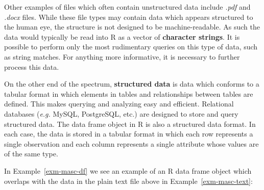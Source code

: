 \documentclass[
  letterpaper,
  DIV=11,
  numbers=noendperiod]{scrreport}
\theoremstyle{definition}
\theoremstyle{remark}
\begin{document}
Other examples of files which often contain unstructured data include
\emph{.pdf} and \emph{.docx} files. While these file types may contain
data which appears structured to the human eye, the structure is not
designed to be machine-readable. As such the data would typically be
read into R as a vector of \textbf{character strings}. It is possible to
perform only the most rudimentary queries on this type of data, such as
string matches. For anything more informative, it is necessary to
further process this data.

On the other end of the spectrum, \textbf{structured data} is data which
conforms to a tabular format in which elements in tables and
relationships between tables are defined. This makes querying and
analyzing easy and efficient. Relational databases (\emph{e.g.} MySQL,
PostgreSQL, etc.) are designed to store and query structured data. The
data frame object in R is also a structured data format. In each case,
the data is stored in a tabular format in which each row represents a
single observation and each column represents a single attribute whose
values are of the same type.

In Example~\ref{exm-masc-df} we see an example of an R data frame object
which overlaps with the data in the plain text file above in
Example~\ref{exm-masc-text}:
\end{document}
